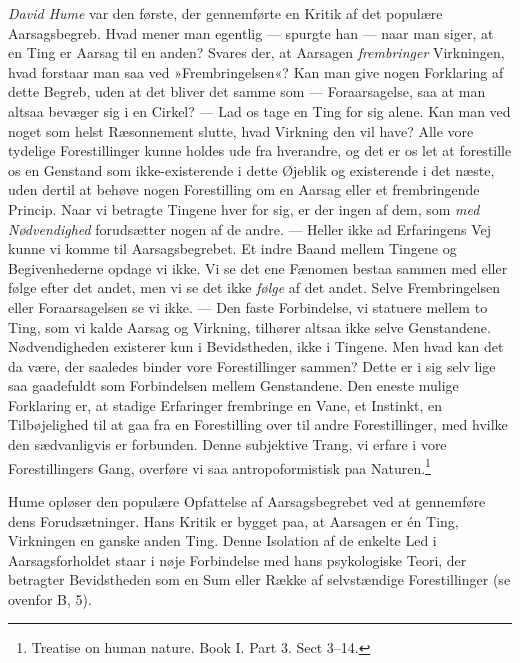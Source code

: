 \documentclass[12pt,a4paper,openany]{book}
\newcommand{\opage}[1]{\marginnote{\footnotesize\textit{[#1]}}}
\begin{document}
\emph{David Hume} var den første, der gennemførte en Kritik af det
populære Aarsagsbegreb. Hvad mener man egentlig --- spurgte han --- naar
man siger, at en Ting er Aarsag til en anden? Svares der, at Aarsagen
\emph{frembringer} Virkningen, hvad forstaar man saa ved
»Frembringelsen«? Kan man give nogen Forklaring af dette Begreb, uden at
det bliver det samme som --- Foraarsagelse, saa at man altsaa bevæger
sig i en Cirkel? --- Lad os tage en Ting for sig alene. Kan man ved
noget som helst Ræsonnement slutte, hvad Virkning den vil have? Alle
vore tydelige Forestillinger kunne holdes ude fra hverandre, og det er
os let at forestille os en Genstand som ikke-existerende i dette Øjeblik
og existerende i det næste, uden dertil at behøve nogen Forestilling om
en Aarsag eller et frembringende Princip. Naar vi betragte Tingene hver
for sig, er der ingen af dem, som \emph{med Nødvendighed} forudsætter
nogen af de andre. --- Heller ikke ad Erfaringens
\opage{256}Vej kunne vi komme til Aarsagsbegrebet. Et indre Baand mellem
Tingene og Begivenhederne opdage vi ikke. Vi se det ene Fænomen bestaa
sammen med eller følge efter det andet, men vi se det ikke \emph{følge}
af det andet. Selve Frembringelsen eller Foraarsagelsen se vi ikke. ---
Den faste Forbindelse, vi statuere mellem to Ting, som vi kalde Aarsag
og Virkning, tilhører altsaa ikke selve Genstandene. Nødvendigheden
existerer kun i Bevidstheden, ikke i Tingene. Men hvad kan det da være,
der saaledes binder vore Forestillinger sammen? Dette er i sig selv lige
saa gaadefuldt som Forbindelsen mellem Genstandene. Den eneste mulige
Forklaring er, at stadige Erfaringer frembringe en Vane, et Instinkt, en
Tilbøjelighed til at gaa fra en Forestilling over til andre
Forestillinger, med hvilke den sædvanligvis er forbunden. Denne
subjektive Trang, vi erfare i vore Forestillingers Gang, overføre vi saa
antropoformistisk paa Naturen.\footnote[1]{Treatise on human nature.
Book I. Part 3. Sect 3--14.}

Hume opløser den populære Opfattelse af Aarsagsbegrebet ved at
gennemføre dens Forudsætninger. Hans Kritik er bygget paa, at Aarsagen
er én Ting, Virkningen en ganske anden Ting. Denne Isolation af de
enkelte Led i Aarsagsforholdet staar i nøje Forbindelse med hans
psykologiske Teori, der betragter Bevidstheden som en Sum eller Række af
selvstændige Forestillinger (se ovenfor B, 5).
\end{document}
